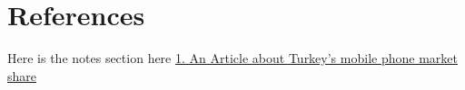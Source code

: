 \documentclass[11pt,titlepage]{article}
\begin{document}
\section{References}
Here is the notes section\newline
\hypertarget{market_share}{here}\newline
\href{http://http://sayarbilgi.net/mobil-aygitlar/7-mobil-aygit-haberleri/88-turkiyenin-en-cok-satan-cep-telefonlari.html}{1. An Article about Turkey's mobile phone market share}
\end{document}
